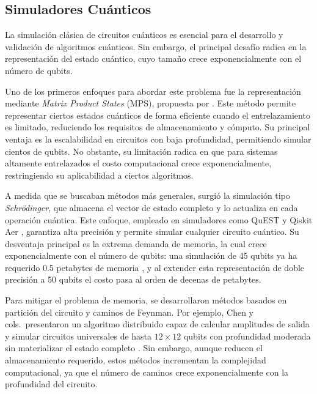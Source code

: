 \subsection{Simuladores Cuánticos}
La simulación clásica de circuitos cuánticos es esencial para el desarrollo y
validación de algoritmos cuánticos. Sin embargo, el principal desafío radica
en la representación del estado cuántico, cuyo tamaño crece exponencialmente con
el número de qubits.

Uno de los primeros enfoques para abordar este problema fue la representación
mediante \textit{Matrix Product States} (MPS), propuesta por \textcite{Vidal2003}.
Este método permite representar ciertos estados cuánticos de forma eficiente
cuando el entrelazamiento es limitado, reduciendo los requisitos de almacenamiento
y cómputo. Su principal ventaja es la escalabilidad en circuitos con baja
profundidad, permitiendo simular cientos de qubits. No obstante, su limitación
radica en que para sistemas altamente entrelazados el costo computacional crece
exponencialmente, restringiendo su aplicabilidad a ciertos algoritmos.

A medida que se buscaban métodos más generales, surgió la simulación tipo
\textit{Schrödinger}, que almacena el vector de estado completo y lo actualiza
en cada operación cuántica. Este enfoque, empleado en simuladores como QuEST y
Qiskit Aer \parencite{Jones2019, qiskit_aer_doc}, garantiza alta precisión y permite simular cualquier
circuito cuántico. Su desventaja principal es la extrema demanda de memoria, la
cual crece exponencialmente con el número de qubits: una simulación de 45 qubits
ya ha requerido 0.5 petabytes de memoria \parencite{Haner2017}, y al extender esta
representación de doble precisión a 50 qubits el costo pasa al orden de decenas de
petabytes.

Para mitigar el problema de memoria, se desarrollaron métodos basados en
partición del circuito y caminos de Feynman. Por ejemplo, Chen y cols.\
presentaron un algoritmo distribuido capaz
de calcular amplitudes de salida y simular circuitos universales de hasta
$12\times12$ qubits con profundidad moderada sin materializar el estado completo
\parencite{Chen2018}. Sin embargo, aunque reducen el
almacenamiento requerido, estos métodos incrementan la complejidad computacional,
ya que el número de caminos crece exponencialmente con la profundidad del
circuito.
